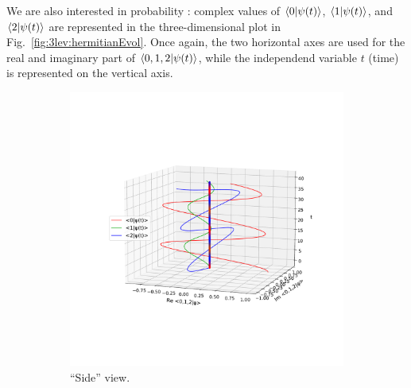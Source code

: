 We are also interested in probability :
complex values of
$\braket{0}{\psi(t)}$, 
$\braket{1}{\psi(t)}$, and
$\braket{2}{\psi(t)}$
are represented in the three-dimensional
plot in Fig.~\ref{fig:3lev:hermitianEvol}.
Once again, the two horizontal axes are used for the real and imaginary part of
$\braket{0, 1, 2}{\psi(t)}$,
while the independend variable $t$ (time) is represented on the vertical axis.
\begin{figure}[]
  \begin{subfigure}[t]{\textwidth}
    \centering
    \includegraphics[height=0.45\textheight,clip,trim=80 180 40 140]{img/3ldetect/hermitianSpaceTime_side.pdf}
    \caption{``Side'' view.}
  \end{subfigure}
  \par\bigskip
  \begin{subfigure}[b]{\textwidth}
    \centering

\end{subfigure}
\end{figure}
